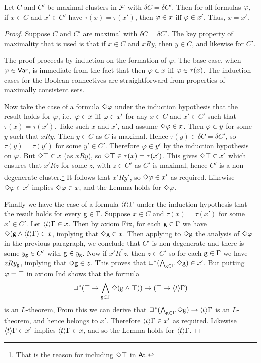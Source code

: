 \begin{lemma} \label{indisting}
Let $C$ and $C'$ be maximal clusters in $\mathcal{F}$ with $\delta C=\delta C'$. Then for all formulas $\varphi$, if $x\in C$ and $x'\in C'$ have $\tau(x)=\tau(x')$, then $\varphi\in x$ iff $\varphi\in x'$. Thus, $x=x'$.
\end{lemma}
\begin{proof}
Suppose $C$ and $C'$ are maximal with $\delta C=\delta C'$. The key property of maximality that is used is that if $x\in C$ and $xRy$, then $y\in C$, and likewise for $C'$.

The proof  proceeds by induction on the formation of $\varphi$. The base case,
when $\varphi\in\mathsf{Var}$, is immediate from the fact that  then $\varphi\in x$ iff $\varphi\in \tau(x)$. The induction cases for the Boolean connectives are straightforward from properties of maximally consistent sets.

Now take the case of a formula $\Diamond\varphi$ under the induction hypothesis that the result holds for $\varphi$, i.e.\ $\varphi\in x$ iff $\varphi\in x'$ for any $x\in C$ and $x'\in C'$ such that $\tau(x)=\tau(x')$. Take such $x$ and $x'$, and assume $\Diamond\varphi\in x$. Then $\varphi\in y$ for some $y$ such that $xRy$. Then $y\in C$ as $C$ is maximal. Hence $\tau(y)\in \delta C=\delta C'$, so 
$\tau(y)=\tau(y')$ for some $y'\in C'$. Therefore $\varphi\in y'$ by the induction hypothesis on $\varphi$. But $\Diamond\top\in x$ (as $xRy$), so $\Diamond\top\in \tau(x)=\tau(x')$. This gives $\Diamond\top\in x'$ which ensures that $x'Rz$ for some $z$, with $z\in C'$ as $C'$ is maximal, hence $C'$ is a non-degenerate cluster.\footnote{That is the reason for including $\Diamond\top$ in $\mathsf{At}$.}  It follows that  $x'Ry'$, so $\Diamond\varphi\in x'$ as required. Likewise $\Diamond\varphi\in x'$ implies $\Diamond\varphi\in x$, and  the Lemma holds for $\Diamond\varphi$.

Finally we have the case of a formula $\langle t\rangle\Gamma$ under the induction hypothesis that the result holds for every ${\sf g}\in\Gamma$.  
Suppose  $x\in C$ and $\tau(x)=\tau(x')$ for some $x'\in C'$. Let $\langle t\rangle\Gamma\in x$. Then by axiom Fix, for each ${\sf g}\in\Gamma$ we have 
$ \Diamond({\sf g}\land\langle t\rangle\Gamma)\in x$, implying that $\Diamond{\sf g}\in x$. Then applying to $\Diamond{\sf g}$ the analysis of $\Diamond\varphi$ in the previous paragraph, we conclude that $C'$ is non-degenerate and there is  some $y_{\sf g}\in C'$ with  ${\sf g}\in y_{\sf g}$. Now if $x'R^*z$, then $z\in C'$ so for each ${\sf g}\in\Gamma$ we have $zR y_{\sf g}$, implying that $\Diamond{\sf g}\in z$.
This proves that 
$\Box^*(\bigwedge_{{\sf g}\in\Gamma}\Diamond{\sf g})\in x'$.
But putting $\varphi=\top$ in axiom Ind shows that the formula
$$
\Box^*(\top\to \bigwedge_{{\sf g}\in\Gamma}\Diamond({\sf g}\land\top))\to(\top\to\langle t\rangle\Gamma)
$$
is an $L$-theorem, From this we can derive that  $\Box^*(\bigwedge_{{\sf g}\in\Gamma}\Diamond{\sf g})\to\langle t\rangle\Gamma$ is an $L$-theorem, and hence belongs to $x'$. Therefore $\langle t\rangle\Gamma\in x'$ as required. Likewise $\langle t\rangle\Gamma\in x'$ implies $\langle t\rangle\Gamma\in x$, and so the Lemma holds for $\langle t\rangle\Gamma$.
\end{proof}

